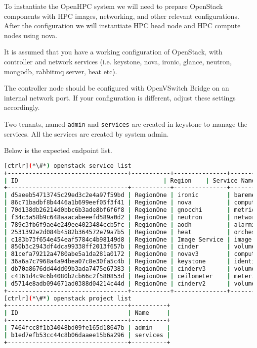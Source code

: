 	To instantiate the OpenHPC system we will need to prepare OpenStack components with HPC images, networking, and other relevant configurations. After the configuration we will instantiate HPC head node and HPC compute nodes using nova. 

	It is assumed that you have a working configuration of OpenStack, with controller and network services (i.e. keystone, nova, ironic, glance, neutron, mongodb, rabbitmq server, heat etc). 

	The controller node should be configured with OpenVSwitch Bridge on an internal network port. If your configuration is different, adjust these settings accordingly.

	Two tenants, named \texttt{admin} and \texttt{services} are created in keystone to manage the services. All the services are created by system admin. 

	Below is the expected endpoint list.



\begin{lstlisting}[language=bash,keywords={}]
[ctrlr](*\#*) openstack service list
+----------------------------------+-----------+---------------+---------------+
| ID                                         | Region    | Service Name  | Service Type  |
+----------------------------------+-----------+---------------+---------------+
| d5aeeb54713745c29ed3c2e4a97f59bd | RegionOne | ironic        | baremetal     |
| 86c71badbf8b4446a1b699eef05f3f41 | RegionOne | nova          | compute       |
| 70d138db26214d0bbc6b3ade8bf6f6f8 | RegionOne | gnocchi       | metric        |
| f34c3a58b9c648aaacabeeefd589a0d2 | RegionOne | neutron       | network       |
| 789c3fb6f9ae4e249ee4023484ccb5fc | RegionOne | aodh          | alarming      |
| 2531392e2d084b4582b364572e79a7b5 | RegionOne | heat          | orchestration |
| c183b73f654e454eaf5784c4b98149d8 | RegionOne | Image Service | image         |
| 850b3c2943df4dca99338ff2013f657b | RegionOne | cinder        | volume        |
| 81cefa79212a4780abe5a1da281a0172 | RegionOne | novav3        | computev3     |
| 36a6a7c7968a4a94bea07c8e30fa5c4b | RegionOne | keystone      | identity      |
| db70a8676dd44dd09b3ada7475e67383 | RegionOne | cinderv3      | volumev3      |
| c4161d4c9c6b4080b2cb66c2f580853d | RegionOne | ceilometer    | metering      |
| d5714e8adb094671ad0388d04214c44d | RegionOne | cinderv2      | volumev2      |
+----------------------------------+-----------+---------------+---------------+
[ctrlr](*\#*) openstack project list
+----------------------------------+----------+
| ID                               | Name     |
+----------------------------------+----------+
| 7464fcc8f1b34048bd09fe165d18647b | admin    |
| b1ed7efb53cc44c8b06daaee15b6a296 | services |
+----------------------------------+----------+
\end{lstlisting}


